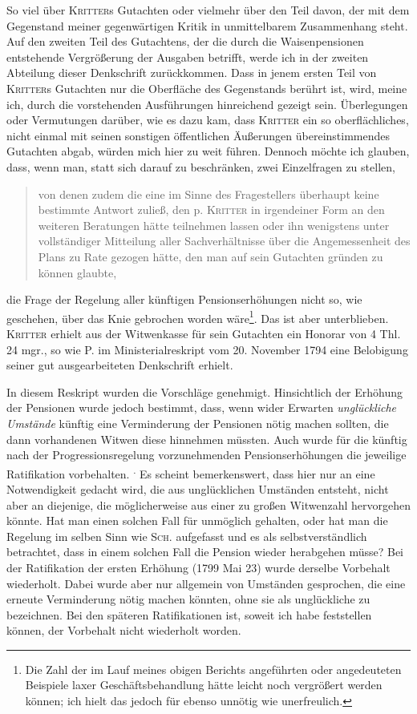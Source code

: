 So viel über \textsc{Kritter}s Gutachten oder vielmehr über den Teil davon, der mit dem Gegenstand meiner gegenwärtigen Kritik in unmittelbarem Zusammenhang steht. Auf den zweiten Teil des Gutachtens, der die durch die Waisenpensionen entstehende Vergrößerung der Ausgaben betrifft, werde ich in der zweiten Abteilung dieser Denkschrift zurückkommen. Dass in jenem ersten Teil von \textsc{Kritter}s Gutachten nur die Oberfläche des Gegenstands berührt ist, wird, meine ich, durch die vorstehenden Ausführungen hinreichend gezeigt sein. Überlegungen oder Vermutungen darüber, wie es dazu kam, dass \textsc{Kritter} ein so oberflächliches, nicht einmal mit seinen sonstigen öffentlichen Äußerungen übereinstimmendes Gutachten abgab, würden mich hier zu weit führen. Dennoch möchte ich glauben, dass, wenn man, statt sich darauf zu beschränken, zwei Einzelfragen zu stellen,
\begin{quote}
von denen zudem die eine im Sinne des Fragestellers überhaupt keine bestimmte Antwort zuließ, den p. \textsc{Kritter} in irgendeiner Form an den weiteren Beratungen hätte teilnehmen lassen oder ihn wenigstens unter vollständiger Mitteilung aller Sachverhältnisse über die Angemessenheit des Plans zu Rate gezogen hätte, den man auf sein Gutachten gründen zu können glaubte,
\end{quote}
\noindent die Frage der Regelung aller künftigen Pensionserhöhungen nicht so, wie geschehen, über das Knie gebrochen worden wäre\footnote{Die Zahl der im Lauf meines obigen Berichts angeführten oder angedeuteten Beispiele laxer Geschäftsbehandlung hätte leicht noch vergrößert werden können; ich hielt das jedoch für ebenso unnötig wie unerfreulich.}. Das ist aber unterblieben. \textsc{Kritter} erhielt aus der Witwenkasse für sein Gutachten ein Honorar von 4 Thl. 24 mgr., so wie P. im Ministerialreskript vom 20. November 1794 eine Belobigung seiner gut ausgearbeiteten Denkschrift erhielt.

In diesem Reskript wurden die Vorschläge genehmigt. Hinsichtlich der Erhöhung der Pensionen wurde jedoch bestimmt, dass, wenn wider Erwarten \textit{unglückliche Umstände} künftig eine Verminderung der Pensionen nötig machen sollten, die dann vorhandenen Witwen diese hinnehmen müssten. Auch wurde für die künftig nach der Progressionsregelung vorzunehmenden Pensionserhöhungen die jeweilige Ratifikation vorbehalten. \textsuperscript{.} Es scheint bemerkenswert, dass hier nur an eine Notwendigkeit gedacht wird, die aus unglücklichen Umständen entsteht, nicht aber an diejenige, die möglicherweise aus einer zu großen Witwenzahl hervorgehen könnte. Hat man einen solchen Fall für unmöglich gehalten, oder hat man die Regelung im selben Sinn wie \textsc{Sch.} aufgefasst und es als selbstverständlich betrachtet, dass in einem solchen Fall die Pension wieder herabgehen müsse? Bei der Ratifikation der ersten Erhöhung (1799 Mai 23) wurde derselbe Vorbehalt wiederholt. Dabei wurde aber nur allgemein von Umständen gesprochen, die eine erneute Verminderung nötig machen könnten, ohne sie als unglückliche zu bezeichnen. Bei den späteren Ratifikationen ist, soweit ich habe feststellen können, der Vorbehalt nicht wiederholt worden.

